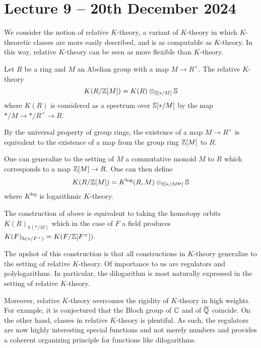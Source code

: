 \section{Lecture 9 -- 20th December 2024}\label{sec: lecture 9}
We consider the notion of relative $K$-theory, a variant of $K$-theory in which $K$-theoretic classes are more easily described, and is as computable as $K$-theory. In this way, relative $K$-theory can be seen as more flexible than $K$-theory. 
\begin{definition}\label{def: relative K-theory}
    Let $R$ be a ring and $M$ an Abelian group with a map $M\to R^{\times}$. The relative $K$-theory 
    $$K(R/\mathbb{Z}[M])= K(R)\otimes_{\mathbb{S}[*/M]}\mathbb{S}$$
    where $K(R)$ is considered as a spectrum over $\mathbb{S}[*/M]$ by the map $*/M\to */R^{\times}\to R$. 
\end{definition}
\begin{remark}
    By the universal property of group rings, the existence of a map $M\to R^{\times}$ is equivalent to the existence of a map from the group ring $\mathbb{Z}[M]$ to $R$. 
\end{remark}
\begin{remark}
    One can generalize  to the setting of $M$ a commutative monoid $M$ to $R$ which corresponds to a map $\mathbb{Z}[M]\to R$. One can then define 
    $$K(R/\mathbb{Z}[M])=K^{\log}(R,M)\otimes_{\mathbb{S}[*/M^{\mathsf{gp}}]}\mathbb{S}$$
    where $K^{\log}$ is logarithmic $K$-theory. 
\end{remark}
\begin{remark}
    The construction of  above is equivalent to taking the homotopy orbits $K(R)_{h(*/M)}$ which in the case of $F$ a field produces $K(F)_{h(*/F^{\times})}=K(F/\mathbb{Z}[F^{\times}])$. 
\end{remark}
The upshot of this construction is that all constructions in $K$-theory generalize to the setting of relative $K$-theory. Of importance to us are regulators and polylogarithms. In particular, the dilogarithm is most naturally expressed in the setting of relative $K$-theory. 

Moreover, relative $K$-theory overcomes the rigidity of $K$-theory in high weights. For example, it is conjectured that the Bloch group of $\mathbb{C}$ and of $\overline{\mathbb{Q}}$ coincide. On the other hand, classes in relative $K$-theory is plentiful. As such, the regulators are now highly interesting special functions and not merely numbers and provides a coherent organizing principle for functions like dilogarithms. 

